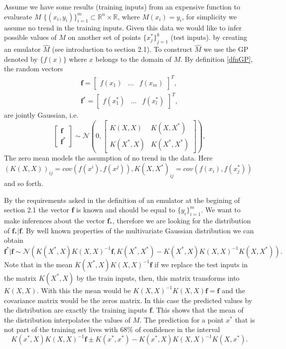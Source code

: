 \documentclass[12pt]{book}
\begin{document}
Assume  we have some  results  (training inputs) from an expensive function to evalueate $M$ 
$\{(x_{i},y_{i})\}_{i=1}^{m}\subset\mathbb{R}^{n}\times\mathbb{R}$, where $M(x_{i})=y_{i}$, for
simplicity we assume no trend in the training inputs. Given this data 
we would like to infer  possible values of $M$ on another set of points $\{x_{j}^{*}\}_{j=1}^{k}$ (test inputs).
by creating an emulator $\hat{M}$ (see introduction to section 2.1).
To construct $\hat{M}$  we  use the GP denoted by $\{f(x)\}$ where $x$ belongs to the domain of $M$. By
definition \ref{dfnGP}, the random vectors
\begin{eqnarray*}
\textbf{f}=\begin{bmatrix}f(x_{1}) & \ldots & f(x_{m}) \end{bmatrix}^{T}, \\
\textbf{f}^{*}=\begin{bmatrix}f(x_{1}^{*}) & \ldots & f(x_{l}^{*}) \end{bmatrix}^{T},
\end{eqnarray*}
are  jointly Gaussian, i.e. 
\begin{equation}\label{eqnconditional}
\begin{bmatrix}
\textbf{f} \\
\textbf{f}^{*}
\end{bmatrix}\sim\mathscr{N}\left(0,\begin{bmatrix} K(X,X) & K(X,X^{*}) \\
						    K(X^{*},X) & K(X^{*},X^{*}) \end{bmatrix}
\right),
\end{equation}	
The zero mean models the assumption of no trend in the data. 
Here
$(K(X,X))_{ij}=cov(f(x^{i}),f(x^{j})), K(X,X^{*})_{ij}=cov(f(x_{i}),f(x_{j}^{*}))$ and so forth.


By the requirements asked in the definition of an emulator at the begining of section 2.1
 the vector $\textbf{f}$ is known and should be equal to $\{y_{i}\}_{i=1}^{m}$.  
We want to make inferences about the vector $\textbf{f}_{*}$,
therefore we are looking for the distribution of $\textbf{f}_{*}|\textbf{f}$. By well known properties
of the multivariate Gaussian distribution we can obtain  \cite{lifshits2013gaussian}
\begin{equation}\label{eqnformulameancovariance}
\textbf{f}^{*}|\textbf{f}\sim\mathscr{N}\left(K(X^{*},X)K(X,X)^{-1}\textbf{f},
K(X^{*},X^{*})-K(X^{*},X)K(X,X)^{-1}K(X,X^{*})\right).
\end{equation}
Note that in the mean $K(X^{*},X)K(X,X)^{-1}\textbf{f}$ if we replace the test inputs in the matrix
$K(X^{*},X)$ by the train inputs, then, this matrix transforms into $K(X,X)$. With this the mean
would be $K(X,X)^{-1}K(X,X)\textbf{f}=\textbf{f}$ and the covariance matrix would be the zeros matrix. 
In this case the predicted values by the distribution are exactly the training inputs $\textbf{f}$.
This shows that the mean of the distribution interpolates the values  of $M$. The prediction for
a point $x^{*}$ that is not part of the training set lives with $68\%$ of confidence in the interval
\begin{equation*}
K(x^{*},X)K(X,X)^{-1}\textbf{f}\pm K(x^{*},x^{*})-K(x^{*},X)K(X,X)^{-1}K(X,x^{*}).
\end{equation*}
\end{document}
